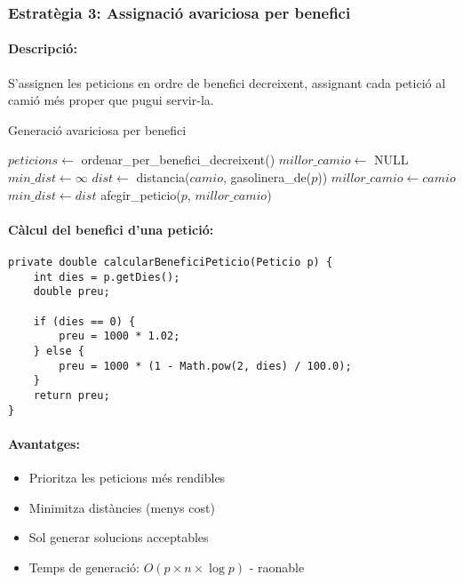 \subsubsection{Estratègia 3: Assignació avariciosa per benefici}

\paragraph{Descripció:}
S'assignen les peticions en ordre de benefici decreixent, assignant cada petició al camió més proper que pugui servir-la.

\begin{algorithm}[H]
\caption{Generació avariciosa per benefici}
\begin{algorithmic}[1]
\State $peticions \gets$ ordenar\_per\_benefici\_decreixent()
    \State $millor\_camio \gets$ NULL
    \State $min\_dist \gets \infty$
        \State $dist \gets$ distancia($camio$, gasolinera\_de($p$))
            \State $millor\_camio \gets camio$
            \State $min\_dist \gets dist$
        \EndIf
    \EndFor
        \State afegir\_peticio($p$, $millor\_camio$)
    \EndIf
\EndFor
\end{algorithmic}
\end{algorithm}

\paragraph{Càlcul del benefici d'una petició:}
\begin{lstlisting}[caption={Càlcul del benefici}, label={lst:benefici-peticio}]
private double calcularBeneficiPeticio(Peticio p) {
    int dies = p.getDies();
    double preu;
    
    if (dies == 0) {
        preu = 1000 * 1.02;
    } else {
        preu = 1000 * (1 - Math.pow(2, dies) / 100.0);
    }
    return preu;
}
\end{lstlisting}

\paragraph{Avantatges:}
\begin{itemize}
    \item Prioritza les peticions més rendibles
    \item Minimitza distàncies (menys cost)
    \item Sol generar solucions acceptables
    \item Temps de generació: $O(p \times n \times \log p)$ - raonable
\end{itemize}


